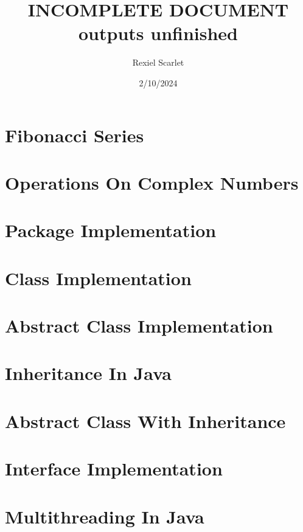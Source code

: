 \documentclass{article}
\title{%
  INCOMPLETE DOCUMENT \\
  \large outputs unfinished 
}
\author{Rexiel Scarlet}
\date{2/10/2024}
\begin{document}
\maketitle
\newpage

\tableofcontents
\newpage

\section{Fibonacci Series}

\newpage

\section{Operations On Complex Numbers}

\newpage

\section{Package Implementation}

\newpage

\section{Class Implementation}

\newpage

\section{Abstract Class Implementation}

\newpage

\section{Inheritance In Java}

\newpage

\section{Abstract Class With Inheritance}

\newpage

\section{Interface Implementation}

\newpage

\section{Multithreading In Java}

\newpage
\end{document}
